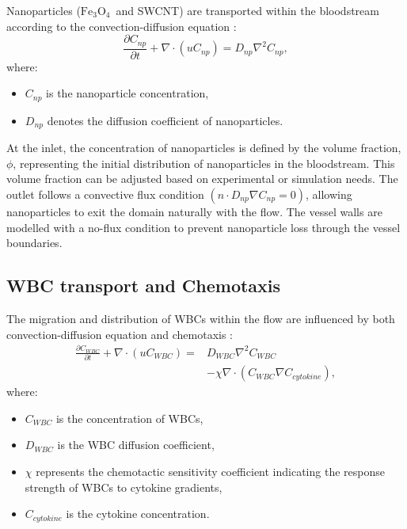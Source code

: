 \documentclass[10pt]{NSP1}
\def\feo{\ensuremath{\mathrm{Fe}_3\mathrm{O}_4}}
\begin{document}
	Nanoparticles (\feo\ and SWCNT) are transported within the bloodstream according to the convection-diffusion equation \cite{Gentile2008,Fullstone2015}:
	\begin{equation}\label{eq:np}
		\frac{\partial C_{np}}{\partial t} + \nabla\cdot\left( uC_{np} \right) = D_{np}\nabla^{2}C_{np},
	\end{equation}
	where:
	\begin{itemize}
		\item $C_{np}$ is the nanoparticle concentration,
		\item $D_{np}$ denotes the diffusion coefficient of nanoparticles.
	\end{itemize}
	
	At the inlet, the concentration of nanoparticles is defined by the volume fraction, $\phi$, representing the initial distribution of nanoparticles in the bloodstream. This volume fraction can be adjusted based on experimental or simulation needs. The outlet follows a convective flux condition $(n\cdot D_{np}\nabla C_{np} = 0)$, allowing nanoparticles to exit the domain naturally with the flow. The vessel walls are modelled with a no-flux condition to prevent nanoparticle loss through the vessel boundaries.
	
	\subsection{WBC transport and Chemotaxis}
	\label{sec:wbc}
	
	The migration and distribution of WBCs within the flow are influenced by both convection-diffusion equation and chemotaxis \cite{Zlotnik2000,Gerhardt2015}:
	\begin{equation}\label{eq:wbc}
		\begin{split}
			\frac{\partial C_{WBC}}{\partial t} + \nabla \cdot (uC_{WBC}) ={} & D_{WBC}\nabla^{2}C_{WBC}\\
			&- \chi\nabla \cdot (C_{WBC}\nabla C_{cytokine}),
		\end{split}
	\end{equation}
	where:
	\begin{itemize}
		\item $C_{WBC}$ is the concentration of WBCs,
		\item $D_{WBC}$ is the WBC diffusion coefficient,
		\item $\chi$ represents the chemotactic sensitivity coefficient indicating the response strength of WBCs to cytokine gradients,
		\item $C_{cytokine}$ is the cytokine concentration.
	\end{itemize}
	
\end{document}

